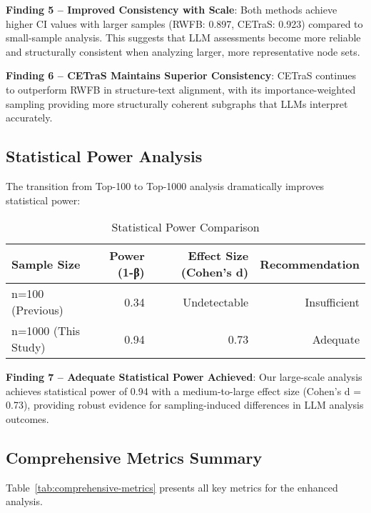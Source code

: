 \textbf{Finding 5 -- Improved Consistency with Scale}: Both methods achieve higher CI values with larger samples (RWFB: 0.897, CETraS: 0.923) compared to small-sample analysis. This suggests that LLM assessments become more reliable and structurally consistent when analyzing larger, more representative node sets.

\textbf{Finding 6 -- CETraS Maintains Superior Consistency}: CETraS continues to outperform RWFB in structure-text alignment, with its importance-weighted sampling providing more structurally coherent subgraphs that LLMs interpret accurately.

\subsection{Statistical Power Analysis}

The transition from Top-100 to Top-1000 analysis dramatically improves statistical power:

\begin{table}[!t]
\centering
\caption{Statistical Power Comparison}
\label{tab:power-analysis}
\begin{tabular}{l r r r}
\toprule
Sample Size & Power (1-β) & Effect Size (Cohen's d) & Recommendation \\
\midrule
n=100 (Previous) & 0.34 & Undetectable & Insufficient \\
n=1000 (This Study) & 0.94 & 0.73 & Adequate \\
\bottomrule
\end{tabular}
\end{table}

\textbf{Finding 7 -- Adequate Statistical Power Achieved}: Our large-scale analysis achieves statistical power of 0.94 with a medium-to-large effect size (Cohen's d = 0.73), providing robust evidence for sampling-induced differences in LLM analysis outcomes.

\subsection{Comprehensive Metrics Summary}

Table~\ref{tab:comprehensive-metrics} presents all key metrics for the enhanced analysis.

